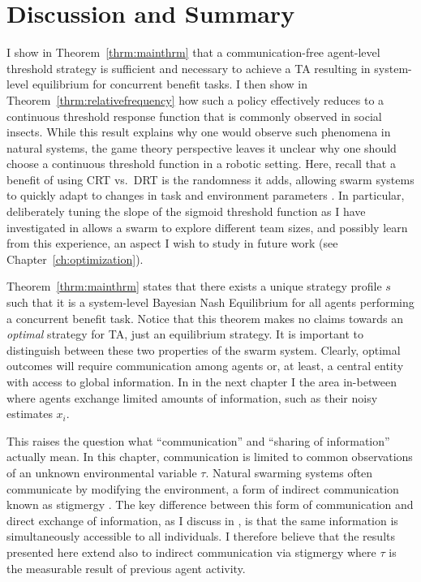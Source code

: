 \documentclass[defaultstyle,12pt]{thesis}
\begin{document}
\section{Discussion and Summary}\label{sec:discsum}
I show in Theorem~\ref{thrm:mainthrm} that a communication-free agent-level threshold strategy is sufficient and necessary to achieve a TA resulting in system-level equilibrium for concurrent benefit tasks. I then show in Theorem~\ref{thrm:relativefrequency} how such a policy effectively reduces to a continuous threshold response function that is commonly observed in social insects. While this result explains why one would observe such phenomena in natural systems, the game theory perspective leaves it unclear why one should choose a continuous threshold function in a robotic setting. Here, recall that a benefit of using CRT vs.~DRT is the randomness it adds, allowing swarm systems to quickly adapt to changes in task and environment parameters \cite{Bonabeau1997}. In particular, deliberately tuning the slope of the sigmoid threshold function as I have investigated in \cite{Kanakia2014} allows a swarm to explore different team sizes, and possibly learn from this experience, an aspect I wish to study in future work (see Chapter~\ref{ch:optimization}). 

Theorem~\ref{thrm:mainthrm} states that there exists a unique strategy profile $s$ such that it is a system-level Bayesian Nash Equilibrium for all agents performing a concurrent benefit task. Notice that this theorem makes no claims towards an \emph{optimal} strategy for TA, just an equilibrium strategy. It is important to distinguish between these two properties of the swarm system. Clearly, optimal outcomes will require communication among agents or, at least, a central entity with access to global information. In in the next chapter I the area in-between where agents exchange limited amounts of information, such as their noisy estimates $x_i$.

This raises the question what ``communication'' and ``sharing of information'' actually mean. In this chapter, communication is limited to common observations of an unknown environmental variable $\tau$. Natural swarming systems often communicate by modifying the environment, a form of indirect communication known as stigmergy \cite{Grasse1959}. The key difference between this form of communication and direct exchange of information, as I discuss in \cite{Touri2014}, is that the same information is simultaneously accessible to all individuals. I therefore believe that the results presented here extend also to indirect communication via stigmergy where $\tau$ is the measurable result of previous agent activity.
\end{document}
